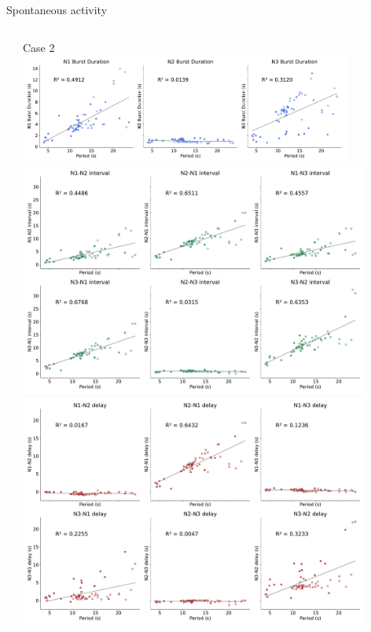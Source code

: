 \documentclass[aspectratio=43]{beamer}
\begin{document}
\begin{frame}{Spontaneous activity}
{\begin{columns}
\begin{column}{0.5\textwidth}
			\end{column}
			\begin{column}{0.5\textwidth}
				\centering \small{Case 2\\}	\includegraphics[width=0.85\textwidth]{invariants/data/SUSSEX/prep3/images/3phases/_durations.pdf}	\includegraphics[width=0.9\textwidth]{invariants/data/SUSSEX/prep3/images/3phases/_intervals.pdf}	\includegraphics[width=0.9\textwidth]{invariants/data/SUSSEX/prep3/images/3phases/_delays.pdf}
			\end{column}
		\end{columns}
	}
\end{frame}
\end{document}
